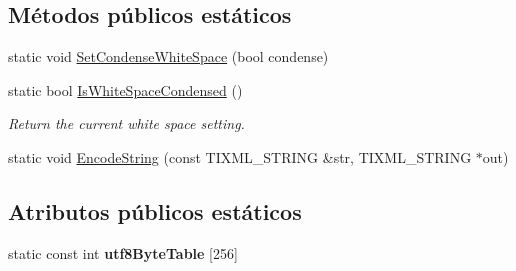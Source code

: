 \subsection*{Métodos públicos estáticos}
\begin{DoxyCompactItemize}
\item 
static void \hyperlink{class_ti_xml_base_a0f799ec645bfb8d8a969e83478f379c1}{Set\-Condense\-White\-Space} (bool condense)
\item 
\hypertarget{class_ti_xml_base_ad4b1472531c647a25b1840a87ae42438}{static bool \hyperlink{class_ti_xml_base_ad4b1472531c647a25b1840a87ae42438}{Is\-White\-Space\-Condensed} ()}\label{class_ti_xml_base_ad4b1472531c647a25b1840a87ae42438}

\begin{DoxyCompactList}\small\item\em Return the current white space setting. \end{DoxyCompactList}\item 
static void \hyperlink{class_ti_xml_base_a32ed202562b58de64c7d799ca3c9db98}{Encode\-String} (const T\-I\-X\-M\-L\-\_\-\-S\-T\-R\-I\-N\-G \&str, T\-I\-X\-M\-L\-\_\-\-S\-T\-R\-I\-N\-G $\ast$out)
\end{DoxyCompactItemize}
\subsection*{Atributos públicos estáticos}
\begin{DoxyCompactItemize}
\item 
static const int {\bfseries utf8\-Byte\-Table} \mbox{[}256\mbox{]}
\end{DoxyCompactItemize}
